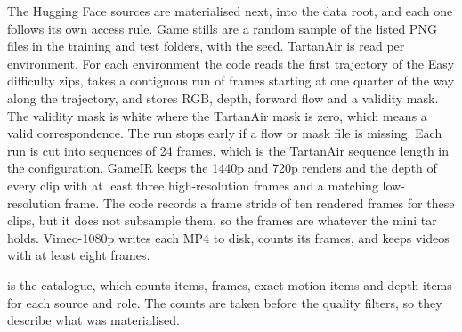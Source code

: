 The Hugging Face sources are materialised next, into the data root, and each one follows its own access rule. Game stills are a random sample of the listed PNG files in the training and test folders, with the seed. TartanAir is read per environment. For each environment the code reads the first trajectory of the Easy difficulty zips, takes a contiguous run of frames starting at one quarter of the way along the trajectory, and stores RGB, depth, forward flow and a validity mask. The validity mask is white where the TartanAir mask is zero, which means a valid correspondence. The run stops early if a flow or mask file is missing. Each run is cut into sequences of 24 frames, which is the TartanAir sequence length in the configuration. GameIR keeps the 1440p and 720p renders and the depth of every clip with at least three high-resolution frames and a matching low-resolution frame. The code records a frame stride of ten rendered frames for these clips, but it does not subsample them, so the frames are whatever the mini tar holds. Vimeo-1080p writes each MP4 to disk, counts its frames, and keeps videos with at least eight frames.

 is the catalogue, which counts items, frames, exact-motion items and depth items for each source and role. The counts are taken before the quality filters, so they describe what was materialised. \Preliminary

